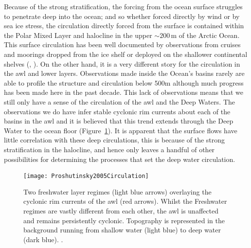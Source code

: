 \documentclass[12pt,a4paper]{report}
\newcommand*\figref[1]{Figure~\ref{#1}}
\begin{document}
Because of the strong stratification, the forcing from the ocean surface 
struggles to penetrate deep into the ocean; and so whether forced directly by wind 
or by sea ice stress, the circulation
directly forced from the surface is contained within the Polar Mixed Layer 
and halocline in the upper ${\sim}200\,\mathrm{m}$ of the Arctic Ocean. 
This surface circulation has been well documented by observations
from cruises and moorings  dropped  from  the  ice  shelf  or  deployed  on 
the  shallower  continental  shelves (\cite{gerdes1997large}, \cite{jones2001circulation}). On the other hand, it is a very different
story for the circulation in the \gls{awl} and lower layers. Observations made
inside the Ocean's basins rarely are able to profile the structure  and
circulation  below 500m  although much progress has been made here in the
past decade. This lack of observations means that  we  still only have  a  sense  of  the circulation 
of the \gls{awl} and the Deep  Waters.  The  observations  we  do 
have  infer stable cyclonic  rim  currents about each of the basins in the
\gls{awl} and it is believed that this trend extends through the Deep Water to the 
ocean floor (\figref{fig:Proshutinsky2005Circulation}).  It is apparent that the surface flows have little correlation with these deep circulations, this is because of the 
strong stratification in the halocline, and hence only leaves a handful of other possibilities for determining the processes that set the deep water circulation.


\begin{figure}
	\centering
	\texttt{[image: Proshutinsky2005Circulation]}
	\caption[\cite{proshutinsky2005arctic}]{ Two freshwater layer regimes (light 
		blue arrows) overlaying the cyclonic rim currents of the \gls{awl} (red arrows).
		Whilst the Freshwater regimes are vastly different from each other, the
		\gls{awl} is unaffected and remains persistently cyclonic.
		Topography is represented in the background running from 
		shallow water (light blue) to deep water (dark blue).  \cite{proshutinsky2005arctic}.}
	\label{fig:Proshutinsky2005Circulation}
\end{figure}
\end{document}

